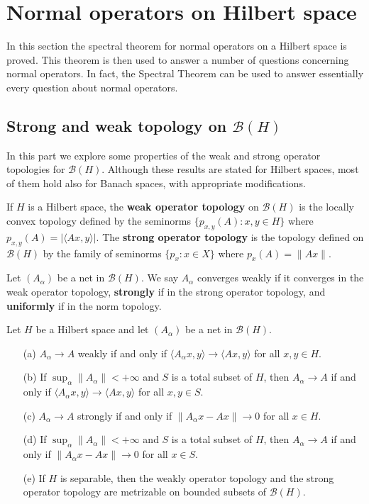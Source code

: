 \section{Normal operators on Hilbert space}
In this section the spectral theorem for normal operators on a Hilbert space is proved. This theorem is then used to answer a number of questions concerning normal operators. In fact, the Spectral Theorem can be used to answer essentially every question about normal operators.
\subsection{Strong and weak topology on \boldmath$\mathcal{B}(H)$}
In this part we explore some properties of the weak and strong operator topologies for $\mathcal{B}(H)$. Although these results are stated for Hilbert spaces, most of them hold also for Banach spaces, with appropriate modifications.
\begin{definition}
If $H$ is a Hilbert space, the \textbf{weak operator topology} on $\mathcal{B}(H)$ is the locally convex topology defined by the seminorms $\{p_{x,y}(A):x,y\in H\}$ where $p_{x,y}(A)=|\langle Ax,y\rangle|$. The \textbf{strong operator topology} is the topology defined on $\mathcal{B}(H)$ by the family of seminorms $\{p_x:x\in X\}$ where $p_x(A)=\|Ax\|$.
\end{definition}
Let $(A_\alpha)$ be a net in $\mathcal{B}(H)$. We say $A_\alpha$ converges weakly if it converges in the weak operator topology, \textbf{strongly} if in the strong operator topology, and \textbf{uniformly} if in the norm topology.
\begin{proposition}
Let $H$ be a Hilbert space and let $(A_\alpha)$ be a net in $\mathcal{B}(H)$.
\begin{itemize}
\item[(a)] $A_\alpha\to A$ weakly if and only if $\langle A_\alpha x,y\rangle\to\langle Ax,y\rangle$ for all $x,y\in H$.
\item[(b)] If $\sup_\alpha\|A_\alpha\|<+\infty$ and $S$ is a total subset of $H$, then $A_\alpha\to A$ if and only if $\langle A_\alpha x,y\rangle\to\langle Ax,y\rangle$ for all $x,y\in S$.
\item[(c)] $A_\alpha\to A$ strongly if and only if $\|A_\alpha x-Ax\|\to 0$ for all $x\in H$.
\item[(d)] If $\sup_\alpha\|A_\alpha\|<+\infty$ and $S$ is a total subset of $H$, then $A_\alpha\to A$ if and only if $\|A_\alpha x-Ax\|\to 0$ for all $x\in S$.
\item[(e)] If $H$ is separable, then the weakly operator topology and the strong operator topology are metrizable on bounded subsets of $\mathcal{B}(H)$.
\end{itemize}
\end{proposition}
